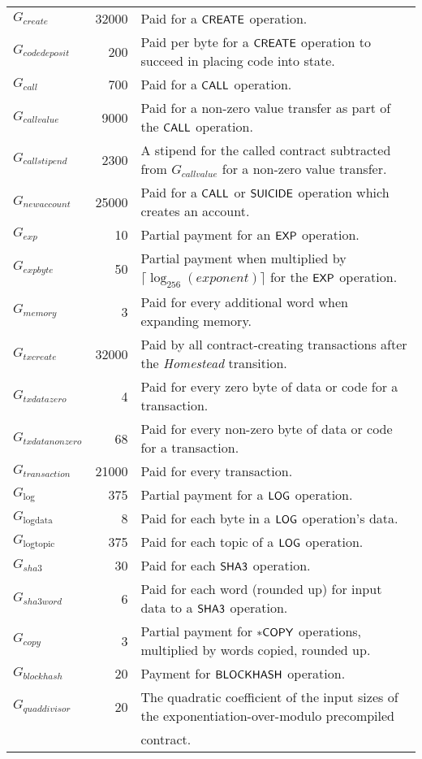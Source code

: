 \begin{center}
\begin{tabu}{l r l}
		$G_{create}$ & 32000 & Paid for a $\mathsf{CREATE}$ operation. \\
		$G_{codedeposit}$ & 200 & Paid per byte for a $\mathsf{CREATE}$ operation to succeed in placing code into state. \\
		$G_{call}$ & 700 & Paid for a $\mathsf{CALL}$ operation. \\
		$G_{callvalue}$ & 9000 & Paid for a non-zero value transfer as part of the $\mathsf{CALL}$ operation. \\
		$G_{callstipend}$ & 2300 & A stipend for the called contract subtracted from $G_{callvalue}$ for a non-zero value transfer. \\
		$G_{newaccount}$ & 25000 & Paid for a $\mathsf{CALL}$ or $\mathsf{SUICIDE}$ operation which creates an account. \\
		$G_{exp}$ & 10 & Partial payment for an $\mathsf{EXP}$ operation. \\
		$G_{expbyte}$ & 50 & Partial payment when multiplied by $\lceil\log_{256}(exponent)\rceil$ for the $\mathsf{EXP}$ operation. \\
		$G_{memory}$ & 3 & Paid for every additional word when expanding memory. \\
		$G_{txcreate}$ & 32000 & Paid by all contract-creating transactions after the {\textit{Homestead} transition}.\\
		$G_{txdatazero}$ & 4 & Paid for every zero byte of data or code for a transaction. \\
		$G_{txdatanonzero}$ & 68 & Paid for every non-zero byte of data or code for a transaction. \\
		$G_{transaction}$ & 21000 & Paid for every transaction. \\
		$G_{\mathrm{log}}$ & 375 & Partial payment for a $\mathsf{LOG}$ operation. \\
		$G_{\mathrm{logdata}}$ & 8 & Paid for each byte in a $\mathsf{LOG}$ operation's data. \\
		$G_{\mathrm{logtopic}}$ & 375 & Paid for each topic of a $\mathsf{LOG}$ operation. \\
		$G_{sha3}$ & 30 & Paid for each $\mathsf{SHA3}$ operation. \\
		$G_{sha3word}$ & 6 & Paid for each word (rounded up) for input data to a $\mathsf{SHA3}$ operation. \\
		$G_{copy}$ & 3 & Partial payment for $\mathsf{*COPY}$ operations, multiplied by words copied, rounded up. \\
		$G_{blockhash}$ & 20 & Payment for $\mathsf{BLOCKHASH}$ operation. \\
		$G_{quaddivisor}$ & 20 & The quadratic coefficient of the input sizes of the exponentiation-over-modulo precompiled\\
		&&contract. \\
		\bottomrule
	\end{tabu}
\end{center}